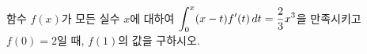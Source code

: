 함수 $f(x)$가 모든 실수 $x$에 대하여 $\displaystyle\int_{0}^{x}(x-t)f'(t)\mkern3mu dt=\dfrac{2}{3}x^3$을 만족시키고 $f(0)=2$일 때, $f(1)$의 값을 구하시오.
